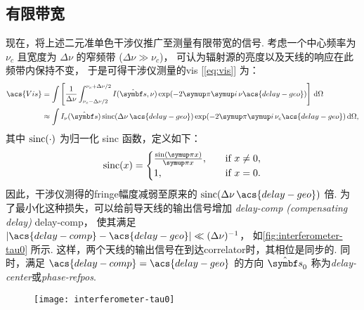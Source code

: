 \subsection{有限带宽}

现在，将上述二元准单色干涉仪推广至测量有限带宽的信号.
考虑一个中心频率为 $\nu_c$ 且宽度为 $\Delta\nu$ 的窄频带 ($\Delta\nu \gg \nu_c$)，
可认为辐射源的亮度以及天线的响应在此频带内保持不变，
于是可得干涉仪测量的\ac{vis} [\autoref{eq:vis}] 为：
\begin{align}
  \acs{Vis} &= \int \left[ \frac{1}{\Delta\nu}
        \int_{\nu_c-\Delta\nu/2}^{\nu_c+\Delta\nu/2}
        I(\hat{\B{s}}, \nu) \exp (-2\Cpi\Ci\, \nu\acs{delay-geo})
      \right] \,\D{\Omega} \\
    &\approx \int I_{\nu}(\hat{\B{s}}) \sinc (\Delta\nu\,\acs{delay-geo})
      \exp (-2\Cpi\Ci\, \nu_c\acs{delay-geo}) \,\D{\Omega},
  \label{eq:vis-bw}
\end{align}
其中 $\operatorname{sinc}(\cdot)$ 为归一化 sinc 函数，定义如下：
\begin{equation}
  \label{eq:sinc}
  \sinc(x) =
    \begin{cases}
      \frac{\sin(\Cpi x)}{\Cpi x}, & \quad \text{if } x \neq 0, \\
      1, & \quad \text{if } x = 0.
    \end{cases}
\end{equation}
因此，干涉仪测得的\ac{fringe}幅度减弱至原来的
$\sinc(\Delta\nu\,\acs{delay-geo})$ 倍.
为了最小化这种损失，可以给前导天线的输出信号增加%
\emph{\acl{delay-comp} (compensating delay)} \ac{delay-comp}，
使其满足 $|\acs{delay-comp} - \acs{delay-geo}| \ll (\Delta\nu)^{-1}$，
如\autoref{fig:interferometer-tau0} 所示.
这样，两个天线的输出信号在到达\ac{correlator}时，其相位是同步的.
同时，满足 $\acs{delay-comp} = \acs{delay-geo}$ 的方向 $\hat{\B{s}}_0$
称为\emph{\acf{delay-center}}或\emph{\acf{phase-refpos}}.

\begin{figure}[htp]
  \centering
  \texttt{[image: interferometer-tau0]}
  \label{fig:interferometer-tau0}
\end{figure}

